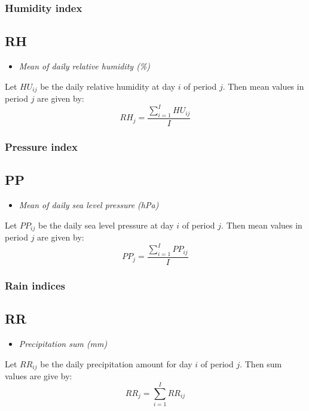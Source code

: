 \documentclass[a4paper,11pt]{article}
\begin{document}
\subsubsection{Humidity index}

\subsection*{RH}
\begin{itemize}
\item \textit{Mean of daily relative humidity (\%)}
\end{itemize}
Let $HU_{ij}$ be the daily relative humidity at day $i$ of period
$j$. Then mean values in period $j$ are given by:
\begin{equation*}
RH_{j} = \frac{\sum_{i=1}^{I} HU_{ij}}{I}
\end{equation*}



\subsubsection{Pressure index}

\subsection*{PP}
\begin{itemize}
\item \textit{Mean of daily sea level pressure (hPa)}
\end{itemize}
Let $PP_{ij}$ be the daily sea level pressure at day $i$ of period
$j$. Then mean values in period $j$ are given by:
\begin{equation*}
PP_{j} = \frac{\sum_{i=1}^{I} PP_{ij}}{I}
\end{equation*}



\subsubsection{Rain indices}

\subsection*{RR}
\begin{itemize}
\item \textit{Precipitation sum (mm)}
\end{itemize}
Let $RR_{ij}$ be the daily precipitation amount for day $i$ of period
$j$. Then sum values are give by:
\begin{equation*}
RR_{j} = \sum_{i=1}^{I} RR_{ij} 
\end{equation*}
\end{document}
